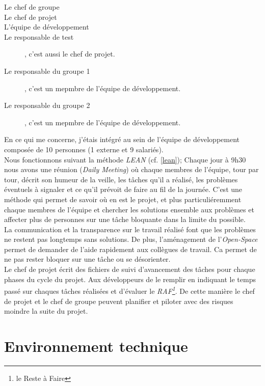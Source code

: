 \begin{description}
  \item[Le chef de groupe]
  \item[Le chef de projet]
  \item[L'équipe de développement]
  \item[Le responsable de test], c'est aussi le chef de projet.
  \item[Le responsable du groupe 1], c'est un mepmbre de l'équipe de développement.
  \item[Le responsable du groupe 2], c'est un mepmbre de l'équipe de développement.\\
\end{description}
En ce qui me concerne, j'étais intégré au sein de l'équipe de développement composée de 10 personnes (1 externe et 9 salariés).
\\Nous fonctionnons suivant la méthode \textit{LEAN} (cf. \ref{lean}); Chaque jour à 9h30 nous avons une réunion (\textit{Daily Meeting}) où chaque membres de l'équipe, tour par tour, décrit son humeur de la veille, les tâches qu'il a réalisé, les problèmes éventuels à signaler et ce qu'il prévoit de faire au fil de la journée. C'est une méthode qui permet de savoir où en est le projet, et plus particuliéremment chaque membres de l'équipe et chercher les solutions ensemble aux problèmes et affecter plus de personnes sur une tâche bloquante dans la limite du possible.
\\La communication et la transparence sur le travail réalisé font que les problèmes ne restent pas longtemps sans solutions.
De plus, l'aménagement de l'\textit{Open-Space} permet de demander de l'aide rapidement aux collègues de travail. Ca permet de ne pas rester bloquer sur une tâche ou se désorienter.
\\Le chef de projet écrit des fichiers de suivi d'avancement des tâches pour chaque phases du cycle du projet. Aux développeurs de le remplir en indiquant le temps passé sur chaques tâches réalisées et d'évaluer le \textit{RAF\footnote{le Reste à Faire}}. De cette manière le chef de projet et le chef de groupe peuvent planifier et piloter avec des risques moindre la suite du projet.
\chapter{Environnement technique}

